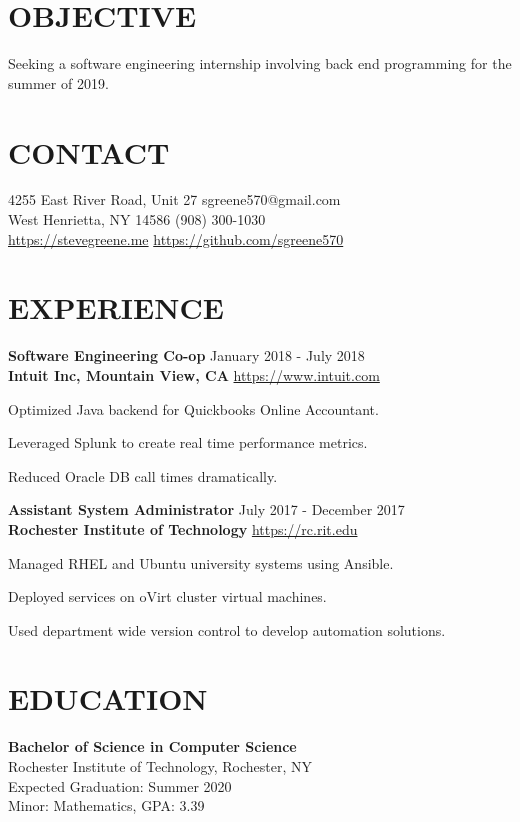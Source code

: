\documentclass[line, margin, 11pt]{res}
\begin{document}

\begin{resume}

\section{OBJECTIVE}
Seeking a software engineering internship involving back end programming for the summer of 2019.

\section {CONTACT}
4255 East River Road, Unit 27 \hfill sgreene570@gmail.com \\
West Henrietta, NY 14586 \hfill (908) 300-1030 \\
\url{https://stevegreene.me} \hfill \url{https://github.com/sgreene570}

\section{EXPERIENCE}
{\bf \large{Software Engineering Co-op}} \hfill January 2018 - July 2018 \\
{\bf Intuit Inc, Mountain View, CA} \hfill \url{https://www.intuit.com}
\begin{compactitem}
    \item Optimized Java backend for Quickbooks Online Accountant.
    \item Leveraged Splunk to create real time performance metrics.
    \item Reduced Oracle DB call times dramatically.
\end{compactitem}

{\bf \large{Assistant System Administrator}} \hfill July 2017 - December 2017 \\
{\bf Rochester Institute of Technology} \hfill \url{https://rc.rit.edu}
\begin{compactitem}
    \item Managed RHEL and Ubuntu university systems using Ansible.
    \item Deployed services on oVirt cluster virtual machines.
    \item Used department wide version control to develop automation solutions.
\end{compactitem}

\section{EDUCATION}
{\bf Bachelor of Science in Computer Science} \\
Rochester Institute of Technology, Rochester, NY \\
Expected Graduation: Summer 2020 \\
Minor: Mathematics, GPA: 3.39



\end{resume}
\end{document}
